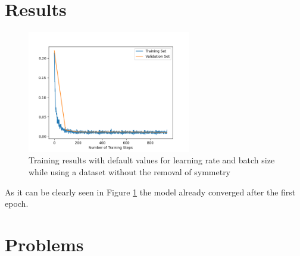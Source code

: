 \documentclass[conference]{IEEEtran}
\begin{document}
\section{Results}

\begin{figure}[!t]
\centering
\includegraphics[width=2.8in]{images/results.png}
\caption{Training results with default values for learning rate and batch
size while using a dataset without the removal of symmetry}
\label{fig}
\end{figure}

As it can be clearly seen in Figure \ref{fig} the model already converged after the 
first epoch.

\section{Problems}
\end{document}
